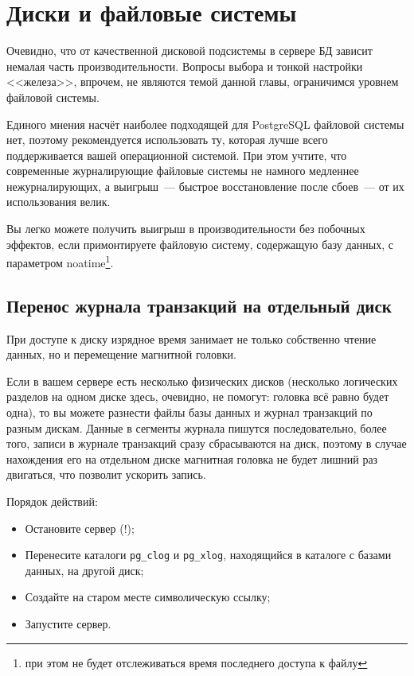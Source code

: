 \section{Диски и файловые системы}

Очевидно, что от качественной дисковой подсистемы в сервере БД зависит немалая часть производительности. Вопросы выбора и тонкой настройки <<железа>>, впрочем, не являются темой данной главы, ограничимся уровнем файловой системы.

Единого мнения насчёт наиболее подходящей для PostgreSQL файловой системы нет, поэтому рекомендуется использовать ту, которая лучше всего поддерживается вашей операционной системой. При этом учтите, что современные журналирующие файловые системы не намного медленнее нежурналирующих, а выигрыш~--- быстрое восстановление после сбоев~--- от их использования велик.

Вы легко можете получить выигрыш в производительности без побочных эффектов, если примонтируете файловую систему, содержащую базу данных, с параметром noatime\footnote{при этом не будет отслеживаться время последнего доступа к файлу}.

\subsection{Перенос журнала транзакций на отдельный диск}
При доступе к диску изрядное время занимает не только собственно чтение данных, но и перемещение магнитной головки.

Если в вашем сервере есть несколько физических дисков (несколько логических разделов на одном диске здесь, очевидно, не помогут: головка всё равно будет одна), то вы можете разнести файлы базы данных и журнал транзакций по разным дискам. Данные в сегменты журнала пишутся последовательно, более того, записи в журнале транзакций сразу сбрасываются на диск, поэтому в случае нахождения его на отдельном диске магнитная головка не будет лишний раз двигаться, что позволит ускорить запись.

Порядок действий:

\begin{itemize}
  \item Остановите сервер (!);
  \item Перенесите каталоги \lstinline!pg_clog! и \lstinline!pg_xlog!, находящийся в каталоге с базами данных, на другой диск;
  \item Создайте на старом месте символическую ссылку;
  \item Запустите сервер.
\end{itemize}

